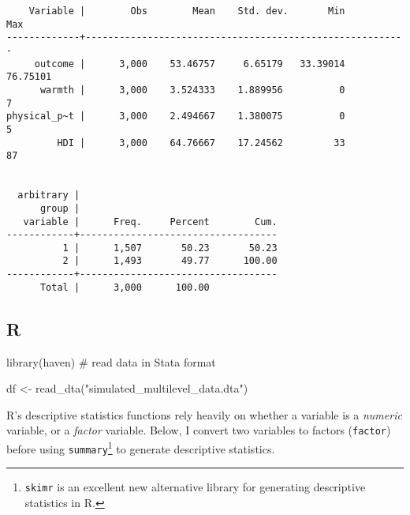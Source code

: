 \documentclass[
  letterpaper,
  DIV=11,
  numbers=noendperiod]{scrreprt}
\newenvironment{Shaded}{\begin{snugshade}}{\end{snugshade}}
\newcommand{\CommentTok}[1]{\textcolor[rgb]{0.37,0.37,0.37}{#1}}
\newcommand{\FunctionTok}[1]{\textcolor[rgb]{0.28,0.35,0.67}{#1}}
\newcommand{\NormalTok}[1]{\textcolor[rgb]{0.00,0.23,0.31}{#1}}
\newcommand{\OtherTok}[1]{\textcolor[rgb]{0.00,0.23,0.31}{#1}}
\newcommand{\SpecialCharTok}[1]{\textcolor[rgb]{0.37,0.37,0.37}{#1}}
\newcommand{\StringTok}[1]{\textcolor[rgb]{0.13,0.47,0.30}{#1}}
\begin{document}
\begin{verbatim}
    Variable |        Obs        Mean    Std. dev.       Min        Max
-------------+---------------------------------------------------------
     outcome |      3,000    53.46757     6.65179   33.39014   76.75101
      warmth |      3,000    3.524333    1.889956          0          7
physical_p~t |      3,000    2.494667    1.380075          0          5
         HDI |      3,000    64.76667    17.24562         33         87


  arbitrary |
      group |
   variable |      Freq.     Percent        Cum.
------------+-----------------------------------
          1 |      1,507       50.23       50.23
          2 |      1,493       49.77      100.00
------------+-----------------------------------
      Total |      3,000      100.00
\end{verbatim}

\subsection{R}

\begin{Shaded}
\begin{Highlighting}[]
\FunctionTok{library}\NormalTok{(haven) }\CommentTok{\# read data in Stata format}

\NormalTok{df }\OtherTok{\textless{}{-}} \FunctionTok{read\_dta}\NormalTok{(}\StringTok{"simulated\_multilevel\_data.dta"}\NormalTok{)}
\end{Highlighting}
\end{Shaded}

R's descriptive statistics functions rely heavily on whether a variable
is a \emph{numeric} variable, or a \emph{factor} variable. Below, I
convert two variables to factors (\texttt{factor}) before using
\texttt{summary}\footnote{\texttt{skimr} is an excellent new alternative
  library for generating descriptive statistics in R.} to generate
descriptive statistics.

\begin{Shaded}
\end{Shaded}
\end{document}
